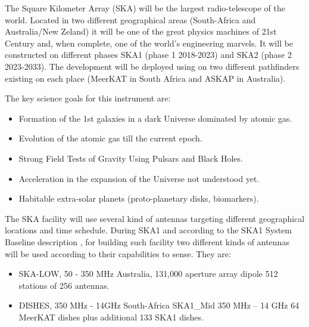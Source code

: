 The Square Kilometer Array (SKA) will be the largest radio-telescope of the world. Located in two different geographical areas (South-Africa and Australia/New Zeland) it will be one of the great physics machines of 21st Century and, when complete, one of the world’s engineering marvels. It will be constructed on different phases SKA1 (phase 1 2018-2023) and SKA2 (phase 2 2023-2033). The development will be deployed using on two different pathfinders existing on each place (MeerKAT in South Africa and ASKAP in Australia). 

The key science goals for this instrument are:

\begin{itemize}
	\item {Formation of the 1st galaxies in a dark Universe dominated by atomic gas.}
	\item {Evolution of the atomic gas till the current epoch.}
	\item {Strong Field Tests of Gravity Using Pulsars and Black Holes.}
	\item {Acceleration in the expansion of the Universe not understood yet.}
	\item {Habitable extra-solar planets (proto-planetary disks, biomarkers).}
\end{itemize}

The SKA facility will use several kind of antennas targeting different geographical locations and time schedule. During SKA1 and according to the SKA1 System Baseline description \cite{ska:baseline_description_v2}, for building such facility two different kinds of antennas will be used according to their capabilities to sense. They are: 

\begin{itemize}
	\item {SKA-LOW, 50 - 350 MHz Australia, 131,000 aperture array dipole 512 stations of 256 antennas.}
	\item {DISHES, 350 MHz - 14GHz South-Africa SKA1\_Mid 350 MHz – 14 GHz 64 MeerKAT dishes plus additional 133 SKA1 dishes.}
\end{itemize}


